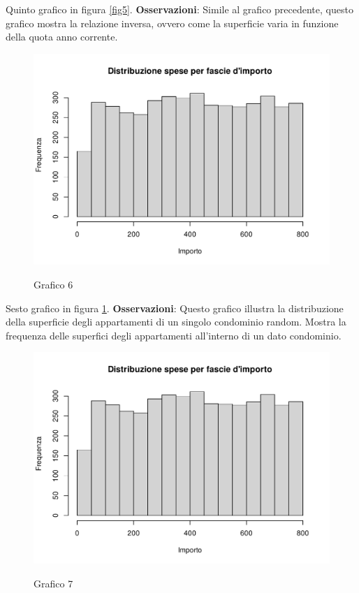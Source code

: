 Quinto grafico in figura \ref{fig5}. \textbf{Osservazioni}: Simile al grafico precedente, questo grafico mostra la relazione inversa, ovvero come la superficie varia in funzione della quota anno corrente.


\clearpage

\begin{figure}[t]
	\caption{Grafico 6}
	\includegraphics[page=6,width=\textwidth]{../R/grafici.pdf}
	\label{fig6}
\end{figure}

Sesto grafico in figura \ref{fig6}. \textbf{Osservazioni}: Questo grafico illustra la distribuzione della superficie degli appartamenti di un singolo condominio random. Mostra la frequenza delle superfici degli appartamenti all'interno di un dato condominio.


\clearpage

\begin{figure}[t]
	\caption{Grafico 7}
	\includegraphics[page=7,width=\textwidth]{../R/grafici.pdf}
	\label{fig7}
\end{figure}


